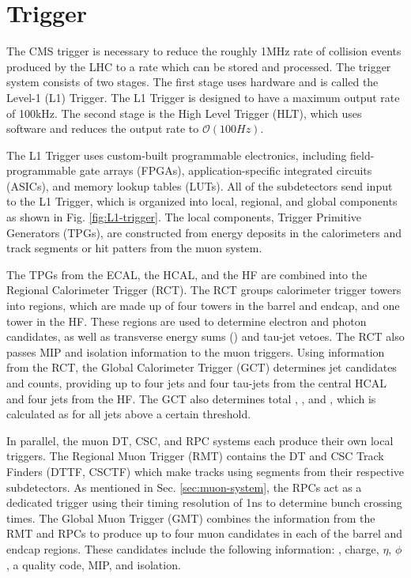 
\section{Trigger}

The CMS trigger is necessary to reduce the roughly 1\unit{MHz} rate of collision events produced by the LHC to a rate which can be stored and processed. The trigger system consists of two stages. The first stage uses hardware and is called the Level-1 (L1) Trigger. The L1 Trigger is designed to have a maximum output rate of 100\unit{kHz}. The second stage is the High Level Trigger (HLT), which uses software and reduces the output rate to $\mathcal{O}(100\unit{Hz})$.

The L1 Trigger uses custom-built programmable electronics, including field-programmable gate arrays (FPGAs), application-specific integrated circuits (ASICs), and memory lookup tables (LUTs). All of the subdetectors send input to the L1 Trigger, which is organized into local, regional, and global components as shown in Fig. \ref{fig:L1-trigger}. The local components, Trigger Primitive Generators (TPGs), are constructed from energy deposits in the calorimeters and track segments or hit patters from the muon system.

The TPGs from the ECAL, the HCAL, and the HF are combined into the Regional Calorimeter Trigger (RCT). The RCT groups calorimeter trigger towers into regions, which are made up of four towers in the barrel and endcap, and one tower in the HF. These regions are used to determine electron and photon candidates, as well as transverse energy sums (\sumet) and tau-jet vetoes. The RCT also passes MIP and isolation information to the muon triggers. Using information from the RCT, the Global Calorimeter Trigger (GCT) determines jet candidates and counts, providing up to four jets and four tau-jets from the central HCAL and four jets from the HF. The GCT also determines total \ET, \met, and \HT, which is calculated as \sumet for all jets above a certain threshold.

In parallel, the muon DT, CSC, and RPC systems each produce their own local triggers. The Regional Muon Trigger (RMT) contains the DT and CSC Track Finders (DTTF, CSCTF) which make tracks using segments from their respective subdetectors. As mentioned in Sec. \ref{sec:muon-system}, the RPCs act as a dedicated trigger using their timing resolution of 1\unit{ns} to determine bunch crossing times. The Global Muon Trigger (GMT) combines the information from the RMT and RPCs to produce up to four muon candidates in each of the barrel and endcap regions. These candidates include the following information: \pt, charge, $\eta$, $\phi$, a quality code, MIP, and isolation.

